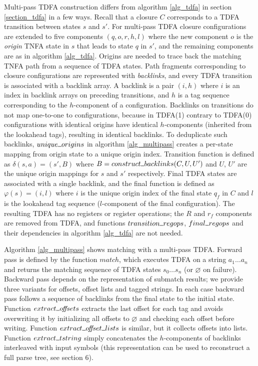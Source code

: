 \documentclass[]{article}
\newcommand{\Xund}{\rule{.5em}{.5pt}}
\begin{document}
Multi-pass TDFA construction differs from algorithm \ref{alg_tdfa} in section \ref{section_tdfa} in a few ways.
Recall that a closure $C$ corresponds to a TDFA transition between states $s$ and $s'$.
For multi-pass TDFA closure configurations are extended to five components $(q, o, r, h, l)$
where the new component $o$ is the \emph{origin} TNFA state in $s$ that leads to state $q$ in $s'$,
and the remaining components are as in algorithm \ref{alg_tdfa}.
Origins are needed to trace back the matching TNFA path from a sequence of TDFA states.
%
Path fragments corresponding to closure configurations are represented with \emph{backlinks},
and every TDFA transition is associated with a backlink array.
A backlink is a pair $(i, h)$ where $i$ is an index in backlink arrays on preceding transitions,
and $h$ is a tag sequence corresponding to the $h$-component of a configuration.
%
Backlinks on transitions do not map one-to-one to configurations,
because in TDFA(1) contrary to TDFA(0) configurations with identical origins have identical $h$-components (inherited from the lookahead tags),
resulting in identical backlinks.
%
To deduplicate such backlinks, $unique \Xund origins$ in algorithm \ref{alg_multipass}
creates a per-state mapping from origin state to a unique origin index.
%
Transition function is defined as $\delta(s, a) = (s', B)$ where $B = construct \Xund backlinks (C, U, U')$
and $U$, $U'$ are the unique origin mappings for $s$ and $s'$ respectively.
%
Final TDFA states are associated with a single backlink,
and the final function is defined as $\varphi(s) = (i, l)$
where $i$ is the unique origin index of the final state $q_f$ in $C$
and $l$ is the lookahead tag sequence ($l$-component of the final configuration).
%
The resulting TDFA has no registers or register operations;
the $R$ and $r_f$ components are removed from TDFA, and
functions $transition \Xund regops$, $final \Xund regops$ and their dependencies in algorithm \ref{alg_tdfa} are not needed.
%
\medskip

Algorithm \ref{alg_multipass} shows matching with a multi-pass TDFA.
Forward pass is defined by the function $match$,
which executes TDFA on a string $a_1 \hdots a_n$ and returns the matching sequence of TDFA states $s_0 \hdots s_n$ (or $\varnothing$ on failure).
Backward pass depends on the representation of submatch results;
we provide three variants for offsets, offset lists and tagged strings.
In each case backward pass follows a sequence of backlinks from the final state to the initial state.
Function $extract \Xund o\!f\!\!f\!sets$ extracts the last offset for each tag
and avoids overwriting it by initializing all offsets to $\varnothing$ and checking each offset before writing.
Function $extract \Xund o\!f\!\!f\!set \Xund lists$ is similar, but it collects offsets into lists.
Function $extract \Xund tstring$ simply concatenates the $h$-components of backlinks interleaved with input symbols
(this representation can be used to reconstruct a full parse tree, see \cite{BorTro19} section 6).
\medskip
\end{document}
